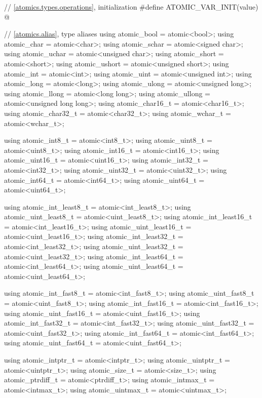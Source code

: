 \begin{codeblock}
{  // \ref{atomics.types.operations}, initialization
  #define ATOMIC_VAR_INIT(value) @\seebelow@

  // \ref{atomics.alias}, type aliases
  using atomic_bool           = atomic<bool>;
  using atomic_char           = atomic<char>;
  using atomic_schar          = atomic<signed char>;
  using atomic_uchar          = atomic<unsigned char>;
  using atomic_short          = atomic<short>;
  using atomic_ushort         = atomic<unsigned short>;
  using atomic_int            = atomic<int>;
  using atomic_uint           = atomic<unsigned int>;
  using atomic_long           = atomic<long>;
  using atomic_ulong          = atomic<unsigned long>;
  using atomic_llong          = atomic<long long>;
  using atomic_ullong         = atomic<unsigned long long>;
  using atomic_char16_t       = atomic<char16_t>;
  using atomic_char32_t       = atomic<char32_t>;
  using atomic_wchar_t        = atomic<wchar_t>;

  using atomic_int8_t         = atomic<int8_t>;
  using atomic_uint8_t        = atomic<uint8_t>;
  using atomic_int16_t        = atomic<int16_t>;
  using atomic_uint16_t       = atomic<uint16_t>;
  using atomic_int32_t        = atomic<int32_t>;
  using atomic_uint32_t       = atomic<uint32_t>;
  using atomic_int64_t        = atomic<int64_t>;
  using atomic_uint64_t       = atomic<uint64_t>;

  using atomic_int_least8_t   = atomic<int_least8_t>;
  using atomic_uint_least8_t  = atomic<uint_least8_t>;
  using atomic_int_least16_t  = atomic<int_least16_t>;
  using atomic_uint_least16_t = atomic<uint_least16_t>;
  using atomic_int_least32_t  = atomic<int_least32_t>;
  using atomic_uint_least32_t = atomic<uint_least32_t>;
  using atomic_int_least64_t  = atomic<int_least64_t>;
  using atomic_uint_least64_t = atomic<uint_least64_t>;

  using atomic_int_fast8_t    = atomic<int_fast8_t>;
  using atomic_uint_fast8_t   = atomic<uint_fast8_t>;
  using atomic_int_fast16_t   = atomic<int_fast16_t>;
  using atomic_uint_fast16_t  = atomic<uint_fast16_t>;
  using atomic_int_fast32_t   = atomic<int_fast32_t>;
  using atomic_uint_fast32_t  = atomic<uint_fast32_t>;
  using atomic_int_fast64_t   = atomic<int_fast64_t>;
  using atomic_uint_fast64_t  = atomic<uint_fast64_t>;

  using atomic_intptr_t       = atomic<intptr_t>;
  using atomic_uintptr_t      = atomic<uintptr_t>;
  using atomic_size_t         = atomic<size_t>;
  using atomic_ptrdiff_t      = atomic<ptrdiff_t>;
  using atomic_intmax_t       = atomic<intmax_t>;
  using atomic_uintmax_t      = atomic<uintmax_t>;

}
\end{codeblock}
